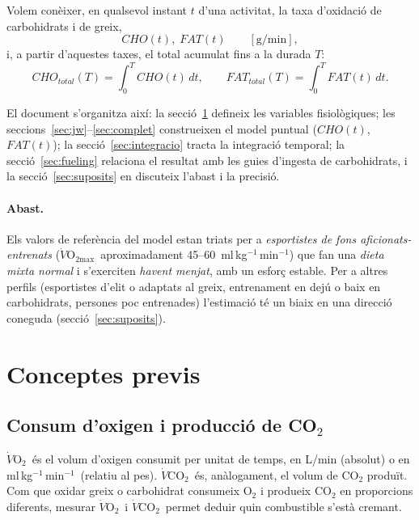 \documentclass[10pt,a4paper]{article}
\newcommand{\VO}{\ensuremath{\dot V\mathrm{O_2}}}
\newcommand{\VCO}{\ensuremath{\dot V\mathrm{CO_2}}}
\newcommand{\VOmax}{\ensuremath{\dot V\mathrm{O_{2max}}}}
\newcommand{\mlkgmin}{ml\,kg$^{-1}$\,min$^{-1}$}
\begin{document}
Volem conèixer, en qualsevol instant $t$ d'una activitat, la taxa d'oxidació de
carbohidrats i de greix,
\begin{equation}
  CHO(t),\; FAT(t) \qquad [\mathrm{g/min}],
\end{equation}
i, a partir d'aquestes taxes, el total acumulat fins a la durada $T$:
\begin{equation}
  CHO_{total}(T)=\int_0^T CHO(t)\,dt, \qquad
  FAT_{total}(T)=\int_0^T FAT(t)\,dt .
  \label{eq:integral}
\end{equation}

El document s'organitza així: la secció~\ref{sec:conceptes} defineix les variables
fisiològiques; les seccions~\ref{sec:jw}--\ref{sec:complet} construeixen el model
puntual ($CHO(t)$, $FAT(t)$); la secció~\ref{sec:integracio} tracta la integració
temporal; la secció~\ref{sec:fueling} relaciona el resultat amb les guies d'ingesta
de carbohidrats, i la secció~\ref{sec:suposits} en discuteix l'abast i la precisió.

\paragraph{Abast.} Els valors de referència del model estan triats per a
\emph{esportistes de fons aficionats-entrenats} (\VOmax\ aproximadament
45--60~\mlkgmin) que fan una \emph{dieta mixta normal} i s'exerciten \emph{havent
menjat}, amb un esforç estable. Per a altres perfils (esportistes d'elit o adaptats
al greix, entrenament en dejú o baix en carbohidrats, persones poc entrenades)
l'estimació té un biaix en una direcció coneguda (secció~\ref{sec:suposits}).

\section{Conceptes previs}\label{sec:conceptes}

\subsection{Consum d'oxigen i producció de CO$_2$}
\VO\ és el volum d'oxigen consumit per unitat de temps, en L/min (absolut) o en
\mlkgmin\ (relatiu al pes). \VCO\ és, anàlogament, el volum de CO$_2$ produït.
Com que oxidar greix o carbohidrat consumeix O$_2$ i produeix CO$_2$ en proporcions
diferents, mesurar \VO\ i \VCO\ permet deduir quin combustible s'està cremant.
\end{document}
